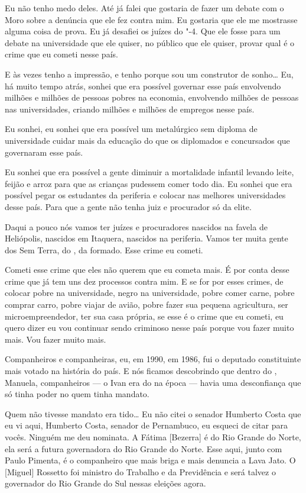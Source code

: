 Eu não tenho medo deles. Até já falei que gostaria de fazer um
debate com o Moro sobre a denúncia que ele fez contra mim. Eu gostaria
que ele me mostrasse alguma coisa de prova. Eu já desafiei os juízes do
"-4. Que ele fosse para um debate na universidade que ele quiser, no
público que ele quiser, provar qual é o crime que eu cometi nesse país.

E às vezes tenho a impressão, e tenho porque sou um construtor
de sonho\ldots{} Eu, há muito tempo atrás, sonhei que era possível
governar esse país envolvendo milhões e milhões de pessoas pobres na
economia, envolvendo milhões de pessoas nas universidades, criando
milhões e milhões de empregos nesse país.

Eu sonhei, eu sonhei que era possível um metalúrgico sem diploma
de universidade cuidar mais da educação do que os diplomados e
concursados que governaram esse país.

Eu sonhei que era possível a gente diminuir a mortalidade infantil
levando leite, feijão e arroz para que as crianças pudessem comer todo
dia. Eu sonhei que era possível pegar os estudantes da periferia e
colocar nas melhores universidades desse país. Para que a gente não
tenha juiz e procurador só da elite.

Daqui a pouco nós vamos ter juízes e procuradores nascidos na
favela de Heliópolis, nascidos em Itaquera, nascidos na periferia. Vamos
ter muita gente dos Sem Terra, do , da  formado. Esse crime eu
cometi.

Cometi esse crime que eles não querem que eu cometa mais. É por
conta desse crime que já tem uns dez processos contra mim. E se for por
esses crimes, de colocar pobre na universidade, negro na universidade,
pobre comer carne, pobre comprar carro, pobre viajar de avião, pobre
fazer sua pequena agricultura, ser microempreendedor, ter sua casa
própria, se esse é o crime que eu cometi, eu quero dizer eu vou
continuar sendo criminoso nesse país porque vou fazer muito mais. Vou
fazer muito mais.

Companheiros e companheiras, eu, em 1990, em 1986, fui o
deputado constituinte mais votado na história do país. E nós ficamos
descobrindo que dentro do , Manuela, companheiros --- o Ivan era do  na
época --- havia uma desconfiança que só tinha poder no  quem tinha
mandato.

Quem não tivesse mandato era tido\ldots{} Eu não citei o senador
Humberto Costa que eu vi aqui, Humberto Costa, senador de Pernambuco, eu
esqueci de citar para vocês. Ninguém me deu nominata. A Fátima
[Bezerra] é do Rio Grande do Norte, ela será a futura governadora do
Rio Grande do Norte. Esse aqui, junto com Paulo Pimenta, é o companheiro
que mais briga e mais denuncia a Lava Jato. O [Miguel] Rossetto foi
ministro do Trabalho e da Previdência e será talvez o governador do Rio
Grande do Sul nessas eleições agora.

